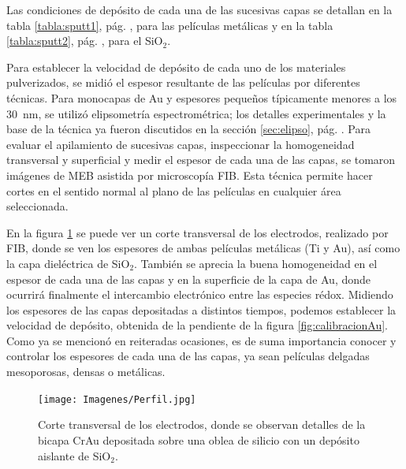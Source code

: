 		 Las condiciones de depósito de cada una de las sucesivas capas se detallan en la tabla \ref{tabla:sputt1}, pág. \pageref{tabla:sputt1}, para las películas metálicas y en la tabla  \ref{tabla:sputt2}, pág. \pageref{tabla:sputt2}, para el SiO$_2$. 

		 Para establecer la velocidad de depósito de cada uno de los materiales pulverizados, se midió el espesor resultante de las películas por diferentes técnicas. Para monocapas de Au y espesores pequeños típicamente menores a los \SI{30}{\nm}, se utilizó elipsometría espectrométrica; los detalles experimentales y la base de la técnica ya fueron discutidos en la sección \ref{sec:elipso}, pág. \pageref{sec:elipso}. Para evaluar el apilamiento de sucesivas capas, inspeccionar la homogeneidad transversal y superficial y medir el espesor de cada una de las capas, se tomaron imágenes de MEB asistida por microscopía FIB. Esta técnica permite hacer cortes en el sentido normal al plano de las películas en cualquier área seleccionada.
		
		 En la figura \ref{fig:FIB_electrodos} se puede ver un corte transversal de los electrodos, realizado por FIB, donde se ven los espesores de ambas películas metálicas (Ti y Au), así como la capa dieléctrica de SiO$_2$. También se aprecia la buena homogeneidad en el espesor de cada una de las capas y en la superficie de la capa de Au, donde ocurrirá finalmente el intercambio electrónico entre las especies rédox. Midiendo los espesores de las capas depositadas a distintos tiempos, podemos establecer la velocidad de depósito, obtenida de la pendiente de la figura \ref{fig:calibracionAu}. Como ya se mencionó en reiteradas ocasiones, es de suma importancia conocer y controlar los espesores de cada una de las capas, ya sean películas delgadas mesoporosas, densas o metálicas.


						  \begin{figure}[th!]
						  \begin{center}
						  \texttt{[image: Imagenes/Perfil.jpg]}
						  \caption[Sección trasversal de los eletrodos]{Corte transversal de los electrodos, donde se observan detalles de la bicapa Cr\textbar Au depositada sobre una oblea de silicio con un depósito aislante de SiO$_2$.}
						  \label{fig:FIB_electrodos}
						  \end{center}
						  \end{figure} 	

